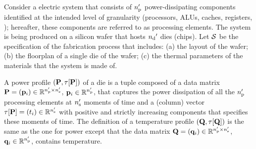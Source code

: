 Consider a electric system that consists of ${n_\text{p}'}$ power-dissipating components identified at the intended level of granularity (processors, ALUs, caches, registers, \etc); hereafter, these components are referred to as processing elements.
The system is being produced on a silicon wafer that hosts ${n_\text{d}}'$ dies (chips).
Let $\mathcal{S}$ be the specification of the fabrication process that includes: (a) the layout of the wafer; (b) the floorplan of a single die of the wafer; (c) the thermal parameters of the materials that the system is made of.

A power profile $\profileP$ of a die is a tuple composed of a data matrix $\mathbf{P} = (\mathbf{p}_i) \in \mathbb{R}^{{n_\text{p}'} \times {n_\text{s}'}}$, $\mathbf{p}_i \in \mathbb{R}^{n_\text{p}'}$, that captures the power dissipation of all the ${n_\text{p}'}$ processing elements at ${n_\text{s}'}$ moments of time and a (column) vector $\tau[\mathbf{P}] = (t_i) \in \mathbb{R}^{{n_\text{s}'}}$ with positive and strictly increasing components that specifies these moments of time.
The definition of a temperature profile $\profileT$ is the same as the one for power except that the data matrix $\mathbf{Q} = (\mathbf{q}_i) \in \mathbb{R}^{{n_\text{p}'} \times {n_\text{s}'}}$, $\mathbf{q}_i \in \mathbb{R}^{n_\text{p}'}$, contains temperature.

